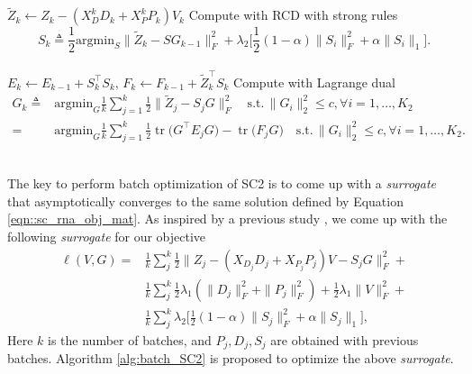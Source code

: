 \documentclass[12pt]{article}
\DeclareMathOperator{\tr}{tr}
\begin{document}
\begin{algorithm}
{{          $\tilde{Z}_k \leftarrow Z_k - (X_D^k D_k + X_P^k P_k) V_k$\;
          Compute with RCD with strong rules
          \begin{equation*}
            S_k \triangleq \frac{1}{2} \mathrm{argmin}_{S} \big \| \tilde{Z}_k - S G_{k-1} \big \|_F^2 + \lambda_2 \bigg[ \frac{1}{2} (1 - \alpha) \|S_i\|_F^2 + \alpha \|S_i\|_1 \bigg].
          \end{equation*}\\
          $E_k \leftarrow E_{k-1} + S_k^\intercal S_k$, $F_k \leftarrow F_{k-1} + \tilde{Z}_k^\intercal S_k$\;
          Compute with Lagrange dual
          \begin{equation*}
            \begin{split}
              G_k \triangleq & \mathrm{argmin}_{G} \frac{1}{k} \sum_{j=1}^k \frac{1}{2}\big \| \tilde{Z}_j - S_j G \big \|_F^2 \quad \mathrm{s.t.} \, \|G_i\|_2^2 \leq c, \forall i = 1, \dots, K_2 \\
              = & \mathrm{argmin}_{G} \frac{1}{k} \sum_{j=1}^k \frac{1}{2} \tr \big(G^\intercal E_j G \big) - \tr \big( F_j G \big) \quad \mathrm{s.t.} \, \|G_i\|_2^2 \leq c, \forall i = 1, \dots, K_2.
            \end{split}
          \end{equation*}\\
        }
      }
    \end{algorithm}    

    The key to perform batch optimization of SC2 is to come up with a \textit{surrogate} that asymptotically converges to the same solution defined by Equation \ref{eqn::sc_rna_obj_mat}. As inspired by a previous study \cite{mairal2009online}, we come up with the following \textit{surrogate} for our objective
    \begin{equation}
      \label{eqn::sc_obj_surrogate}
      \begin{split}
        \ell (V, G) = & \frac{1}{k} \sum_j^k \frac{1}{2} \big \| Z_j -  (X_{D_j} D_j + X_{P_j} P_j) V - S_j G \big \|_F^2 + \\
         & \frac{1}{k} \sum_j^k \frac{1}{2} \lambda_1 (\|D_j\|_F^2 + \|P_j\|_F^2) + \frac{1}{2} \lambda_1 \|V\|_F^2 + \\
         & \frac{1}{k} \sum_j^k \lambda_2 \big[ \frac{1}{2} (1 - \alpha) \|S_j\|_F^2 + \alpha \|S_j\|_1 \big], 
      \end{split}
    \end{equation}
    Here $k$ is the number of batches, and $P_j, D_j, S_j$ are obtained with previous batches. Algorithm \ref{alg:batch_SC2} is proposed to optimize the above \textit{surrogate}. 
\end{document}
